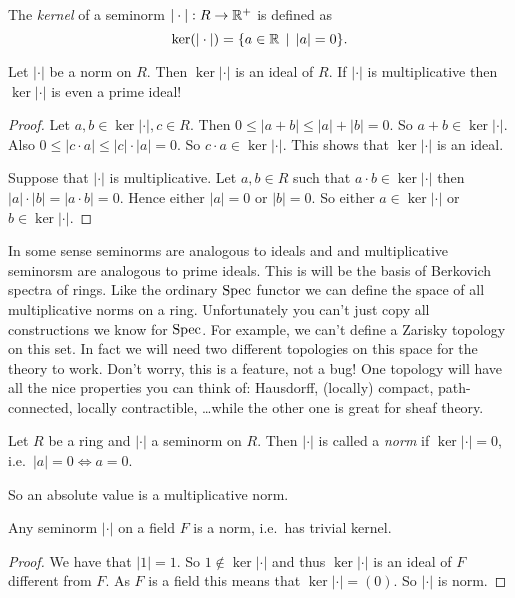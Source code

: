 \begin{definition}
	The \emph{kernel} of a seminorm $|\cdot |: R \to \mathbb{R}^{+}$ is defined as \[
		\ker(|\cdot |) = \{a \in \R \st |a| = 0\} 
	.\] 
\end{definition}
\begin{remark}\label{rem:ker_norm_ideal}
	Let $ |\cdot |$ be a norm on $R$. Then $\ker |\cdot |$ is an ideal of $R$. If $|\cdot |$ is multiplicative then $\ker |\cdot |$ is even a prime ideal!
\end{remark}
\begin{proof}
	Let $a, b \in \ker |\cdot |, c \in R$. Then $0 \le |a + b| \le |a|+|b| = 0$. So  $a + b \in \ker |\cdot |$. 
	Also $0 \le |c \cdot a| \le |c|\cdot |a| = 0$. So $c \cdot a \in \ker |\cdot |$. 
	This shows that $\ker |\cdot  |$ is an ideal. 
	
	Suppose that $|\cdot |$ is multiplicative. 
	Let $a, b\in R $ such that $a\cdot b \in \ker |\cdot |$ then  $|a|\cdot |b| = |a\cdot b| = 0$. 
	Hence either $|a| = 0$ or  $|b|=0$. 
	So either  $a \in \ker |\cdot |$ or $b \in \ker |\cdot |$. 
\end{proof}

In some sense seminorms are analogous to ideals and and multiplicative seminorsm are analogous to prime ideals. This is will be the basis of Berkovich spectra of rings.
Like the ordinary $\operatorname{Spec}$ functor we can define the space of all multiplicative norms on a ring. 
Unfortunately you can't just copy all constructions we know for $\operatorname{Spec}$. 
For example, we can't define a Zarisky topology on this set. 
In fact we will need two different topologies on this space for the theory to work. 
Don't worry, this is a feature, not a bug! 
One topology will have all the nice properties you can think of: Hausdorff, (locally) compact, path-connected, locally contractible, \ldots while the other one is great for sheaf theory. 


\begin{definition}
	Let $R$ be a ring and $|\cdot |$ a seminorm on $R$. 
	Then $|\cdot |$ is called a \emph{norm} if $\ker |\cdot | = 0$, i.e.\ $|a| = 0 \iff a = 0$. 
\end{definition}

So an absolute value is a multiplicative norm. 

\begin{lemma}
	Any seminorm $|\cdot |$ on a field $F$ is a norm, i.e.\ has trivial kernel. 
\end{lemma}
\begin{proof}
	We have that $|1| = 1$. So $1 \not\in \ker |\cdot |$ and thus $\ker |\cdot |$ is an ideal of $F$ different from $F$. 
	As $F$ is a field this means that $\ker |\cdot | = (0)$. So $|\cdot |$ is norm. 
\end{proof}

